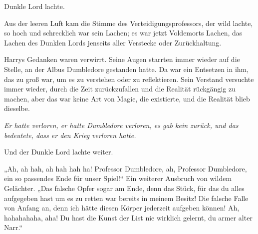 
 Dunkle Lord lachte.

\hplettrineextrapara
Aus der leeren Luft kam die Stimme des Verteidigungsprofessors, der wild lachte, so hoch und schrecklich war sein Lachen; es war jetzt Voldemorts Lachen, das Lachen des Dunklen Lords jenseits aller Verstecke oder Zurückhaltung.

Harrys Gedanken waren verwirrt. Seine Augen starrten immer wieder auf die Stelle, an der Albus Dumbledore gestanden hatte. Da war ein Entsetzen in ihm, das zu groß war, um es zu verstehen oder zu reflektieren. Sein Verstand versuchte immer wieder, durch die Zeit zurückzufallen und die Realität rückgängig zu machen, aber das war keine Art von Magie, die existierte, und die Realität blieb dieselbe.

\emph{Er hatte verloren, er hatte Dumbledore verloren, es gab kein zurück, und das bedeutete, dass er den Krieg verloren hatte.}

Und der Dunkle Lord lachte weiter.

„Ah, ah hah, ah hah hah ha! Professor Dumbledore, ah, Professor Dumbledore, ein so passendes Ende für unser Spiel!“
Ein weiterer Ausbruch von wildem Gelächter.
„Das falsche Opfer sogar am Ende, denn das Stück, für das du alles aufgegeben hast um es zu retten war bereits in meinem Besitz! Die falsche Falle von Anfang an, denn ich hätte diesen Körper jederzeit aufgeben können! Ah, hahahahaha, aha! Du hast die Kunst der List nie wirklich gelernt, du armer alter Narr.“

